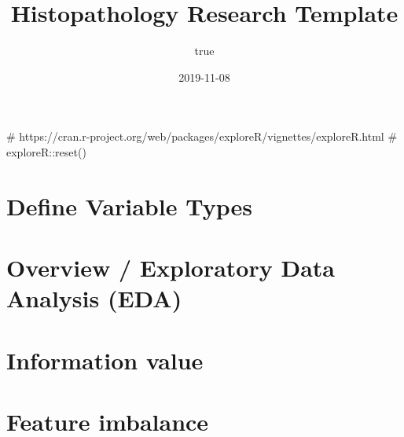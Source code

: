 \documentclass[]{article}
\title{Histopathology Research Template}
\author{true}
\date{2019-11-08}
\newenvironment{Shaded}{\begin{snugshade}}{\end{snugshade}}
\newcommand{\CommentTok}[1]{\textcolor[rgb]{0.54,0.53,0.53}{#1}}
\newcommand{\DataTypeTok}[1]{\textcolor[rgb]{0.00,0.34,0.68}{#1}}
\newcommand{\KeywordTok}[1]{\textcolor[rgb]{0.12,0.11,0.11}{\textbf{#1}}}
\newcommand{\NormalTok}[1]{\textcolor[rgb]{0.12,0.11,0.11}{#1}}
\newcommand{\OperatorTok}[1]{\textcolor[rgb]{0.12,0.11,0.11}{#1}}
\newcommand{\OtherTok}[1]{\textcolor[rgb]{0.00,0.43,0.16}{#1}}
\newcommand{\StringTok}[1]{\textcolor[rgb]{0.75,0.01,0.01}{#1}}
\begin{document}
\maketitle

{
\setcounter{tocdepth}{5}
\tableofcontents
}
\begin{Shaded}
\end{Shaded}

\begin{Shaded}
\begin{Highlighting}[]
\CommentTok{# https://cran.r-project.org/web/packages/exploreR/vignettes/exploreR.html}
\CommentTok{# exploreR::reset()}
\end{Highlighting}
\end{Shaded}

\hypertarget{define-variable-types}{%
\section{Define Variable Types}\label{define-variable-types}}

\hypertarget{overview-exploratory-data-analysis-eda}{%
\section{Overview / Exploratory Data Analysis
(EDA)}\label{overview-exploratory-data-analysis-eda}}

\hypertarget{information-value}{%
\section{Information value}\label{information-value}}

\hypertarget{feature-imbalance}{%
\section{Feature imbalance}\label{feature-imbalance}}
\end{document}
